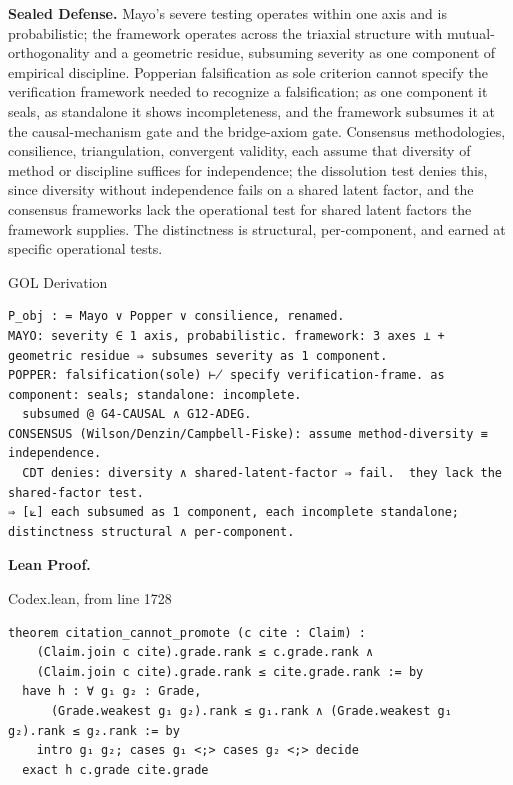 \documentclass[10pt,twocolumn]{article}
\begin{document}
\textbf{Sealed Defense.} Mayo's severe testing operates within one axis
and is probabilistic; the framework operates across the triaxial
structure with mutual-orthogonality and a geometric residue, subsuming
severity as one component of empirical discipline. Popperian
falsification as sole criterion cannot specify the verification
framework needed to recognize a falsification; as one component it
seals, as standalone it shows incompleteness, and the framework subsumes
it at the causal-mechanism gate and the bridge-axiom gate. Consensus
methodologies, consilience, triangulation, convergent validity, each
assume that diversity of method or discipline suffices for independence;
the dissolution test denies this, since diversity without independence
fails on a shared latent factor, and the consensus frameworks lack the
operational test for shared latent factors the framework supplies. The
distinctness is structural, per-component, and earned at specific
operational tests.

\begin{golbox}{GOL Derivation}
\begin{lstlisting}[style=golv]
P_obj : = Mayo ∨ Popper ∨ consilience, renamed.
MAYO: severity ∈ 1 axis, probabilistic. framework: 3 axes ⊥ + geometric residue ⇒ subsumes severity as 1 component.
POPPER: falsification(sole) ⊬ specify verification-frame. as component: seals; standalone: incomplete.
  subsumed @ G4-CAUSAL ∧ G12-ADEG.
CONSENSUS (Wilson/Denzin/Campbell-Fiske): assume method-diversity ≡ independence.
  CDT denies: diversity ∧ shared-latent-factor ⇒ fail.  they lack the shared-factor test.
⇒ [⟀] each subsumed as 1 component, each incomplete standalone; distinctness structural ∧ per-component.
\end{lstlisting}
\end{golbox}

\textbf{Lean Proof.}

\begin{leanexcerpt}{Codex.lean, from line 1728}
\begin{lstlisting}[style=leanx,firstnumber=1728]
theorem citation_cannot_promote (c cite : Claim) :
    (Claim.join c cite).grade.rank ≤ c.grade.rank ∧
    (Claim.join c cite).grade.rank ≤ cite.grade.rank := by
  have h : ∀ g₁ g₂ : Grade,
      (Grade.weakest g₁ g₂).rank ≤ g₁.rank ∧ (Grade.weakest g₁ g₂).rank ≤ g₂.rank := by
    intro g₁ g₂; cases g₁ <;> cases g₂ <;> decide
  exact h c.grade cite.grade
\end{lstlisting}
\end{leanexcerpt}
\end{document}
